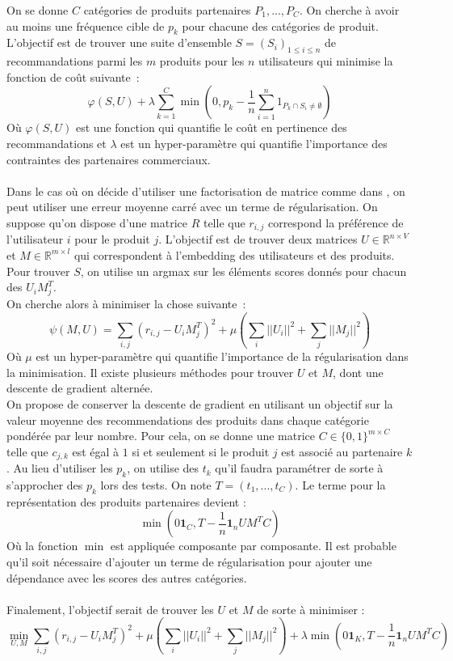 \documentclass{article}
\renewcommand{\phi}[0]{\varphi}
\begin{document}
On se donne $C$ catégories de produits partenaires $P_1, ... , P_C$. On cherche à avoir au moins une fréquence cible de $p_k$ pour chacune des catégories de produit. L'objectif est de trouver une suite d'ensemble $S = (S_i)_{1 \leq i \leq n}$ de recommandations parmi les $m$ produits pour les $n$ utilisateurs qui minimise la fonction de coût suivante~:
$$
\phi(S, U)  + \lambda \sum_{k=1}^C\min\left(0, p_k - \frac{1}{n}\sum_{i=1}^{n}1_{P_k\cap S_i\neq \emptyset}\right)
$$
Où $\phi(S,U)$ est une fonction qui quantifie le coût en pertinence des recommandations et $\lambda$ est un hyper-paramètre qui quantifie l'importance des contraintes des partenaires commerciaux.\\
\\
Dans le cas où on décide d'utiliser une factorisation de matrice comme dans \cite{netflixmoney}, on peut utiliser une erreur moyenne carré avec un terme de régularisation. On suppose qu'on dispose d'une matrice $R$ telle que $r_{i,j}$ correspond la préférence de l'utilisateur $i$ pour le produit $j$. L'objectif est de trouver deux matrices $U\in \mathbb{R}^{n\times V}$ et $M\in \mathbb{R}^{m \times l}$ qui correspondent à l'embedding des utilisateurs et des produits. Pour trouver $S$, on utilise un argmax sur les éléments scores donnés pour chacun des $U_iM_j^T$.\\
On cherche alors à minimiser la chose suivante~:
$$
\psi(M, U) = \sum_{i,j} (r_{i,j} - U_iM_j^T)^2 + \mu\left(\sum_i||U_i||^2 + \sum_j||M_j||^2\right)
$$
Où $\mu$ est un hyper-paramètre qui quantifie l'importance de la régularisation dans la minimisation. Il existe plusieurs méthodes pour trouver $U$ et $M$, dont une descente de gradient alternée.\\
On propose de conserver la descente de gradient en utilisant un objectif sur la valeur moyenne des recommendations des produits dans chaque catégorie pondérée par leur nombre. Pour cela, on se donne une matrice $C\in\{0,1\}^{m\times C}$ telle que $c_{j,k}$ est égal à $1$ si et seulement si le produit $j$ est associé au partenaire $k$. Au lieu d'utiliser les $p_k$, on utilise des $t_k$ qu'il faudra paramétrer de sorte à s'approcher des $p_k$ lors des tests. On note $T = ( t_1, ..., t_C)$. Le terme pour la représentation des produits partenaires devient :
$$
\min(0\bm{1}_{C}, T - \frac{1}{n}\bm{1}_{n}UM^TC)
$$
Où la fonction $\min$ est appliquée composante par composante. Il est probable qu'il soit nécessaire d'ajouter un terme de régularisation pour ajouter une dépendance avec les scores des autres catégories. \\
\\
Finalement, l'objectif serait de trouver les $U$ et $M$ de sorte à minimiser :
$$
\min_{U,M}\sum_{i,j} (r_{i,j} - U_iM_j^T)^2 + \mu\left(\sum_i||U_i||^2 + \sum_j||M_j||^2\right) + \lambda \min(0\bm{1}_{K}, T - \frac{1}{n}\bm{1}_{n}UM^TC)
$$
\nocite{toward}
\end{document}
